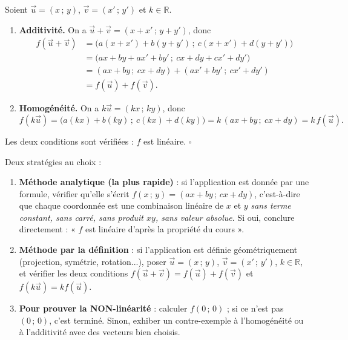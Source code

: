 \documentclass[11pt]{article}
\begin{document}
\begin{experience}
Soient $\vec{u} = (x\,;\,y)$, $\vec{v} = (x'\,;\,y')$ et $k \in \mathbb{R}$.
\begin{enumerate}
\item \textbf{Additivité.} On a $\vec{u} + \vec{v} = (x + x'\,;\,y + y')$, donc
\begin{align*}
f(\vec{u} + \vec{v}) &= \big(a(x + x') + b(y + y')\,;\ c(x + x') + d(y + y')\big) \\
&= \big(ax + by + ax' + by'\,;\ cx + dy + cx' + dy'\big) \\
&= (ax + by\,;\ cx + dy) + (ax' + by'\,;\ cx' + dy') \\
&= f(\vec{u}) + f(\vec{v}).
\end{align*}
\item \textbf{Homogénéité.} On a $k\vec{u} = (kx\,;\,ky)$, donc
\[ f(k\vec{u}) = \big(a(kx) + b(ky)\,;\ c(kx) + d(ky)\big) = k\,(ax + by\,;\ cx + dy) = k\,f(\vec{u}). \]
\end{enumerate}
Les deux conditions sont vérifiées : $f$ est linéaire. $\square$
\end{experience}

\begin{methode}
Deux stratégies au choix :
\begin{enumerate}
\item \textbf{Méthode analytique (la plus rapide)} : si l'application est donnée par une formule, vérifier qu'elle s'écrit $f(x\,;\,y) = (ax + by\,;\,cx + dy)$, c'est-à-dire que chaque coordonnée est une combinaison linéaire de $x$ et $y$ \emph{sans terme constant, sans carré, sans produit $xy$, sans valeur absolue}. Si oui, conclure directement : « $f$ est linéaire d'après la propriété du cours ».
\item \textbf{Méthode par la définition} : si l'application est définie géométriquement (projection, symétrie, rotation...), poser $\vec{u} = (x\,;\,y)$, $\vec{v} = (x'\,;\,y')$, $k \in \mathbb{R}$, et vérifier les deux conditions $f(\vec{u} + \vec{v}) = f(\vec{u}) + f(\vec{v})$ et $f(k\vec{u}) = k f(\vec{u})$.
\item \textbf{Pour prouver la NON-linéarité} : calculer $f(0\,;\,0)$ ; si ce n'est pas $(0\,;\,0)$, c'est terminé. Sinon, exhiber un contre-exemple à l'homogénéité ou à l'additivité avec des vecteurs bien choisis.
\end{enumerate}
\end{methode}
\end{document}
